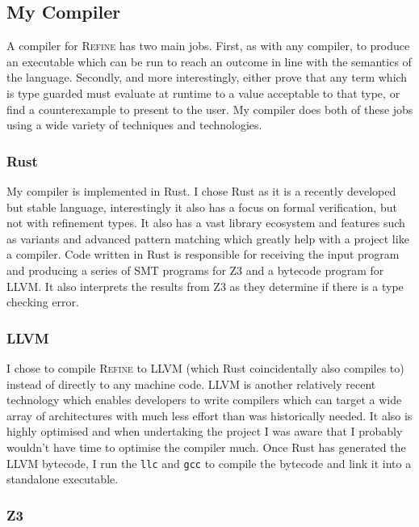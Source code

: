 \subsection{My Compiler}

A compiler for \textsc{Refine} has two main jobs.
First, as with any compiler, to produce an executable which can be run to reach an outcome in line
with the semantics of the language.
Secondly, and more interestingly, either prove that any term which is type guarded must evaluate
at runtime to a value acceptable to that type, or find a counterexample to present to the user.
My compiler does both of these jobs using a wide variety of techniques and technologies.

\subsubsection{Rust}

My compiler is implemented in Rust.
I chose Rust as it is a recently developed but stable language, interestingly it also has a focus
on formal verification, but not with refinement types.
It also has a vast library ecosystem and features such as variants and advanced pattern matching
which greatly help with a project like a compiler.
Code written in Rust is responsible for receiving the input program and producing a series of SMT
programs for Z3 and a bytecode program for LLVM.
It also interprets the results from Z3 as they determine if there is a type checking error.

\subsubsection{LLVM}

I chose to compile \textsc{Refine} to LLVM (which Rust coincidentally also compiles to) instead of
directly to any machine code.
LLVM is another relatively recent technology which enables developers to write compilers which can
target a wide array of architectures with much less effort than was historically needed.
It also is highly optimised and when undertaking the project I was aware that I probably wouldn't
have time to optimise the compiler much.
Once Rust has generated the LLVM bytecode, I run the \texttt{llc} and \texttt{gcc} to compile the
bytecode and link it into a standalone executable.

\subsubsection{Z3}

